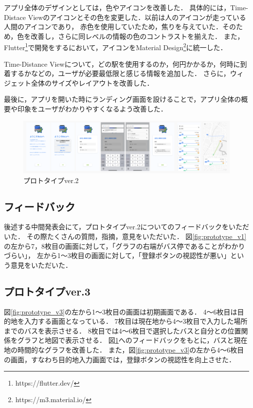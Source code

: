 アプリ全体のデザインとしては，色やアイコンを改善した．
具体的には，Time-Distace Viewのアイコンとその色を変更した．以前は人のアイコンが走っている人間のアイコンであり，
赤色を使用していたため，焦りを与えていた．そのため，色を改善し，さらに同レベルの情報の色のコントラストを揃えた．
また，Flutter\footnote{https://flutter.dev/}で開発をするにおいて，アイコンをMaterial Design\footnote{https://m3.material.io/}に統一した．

Time-Distance Viewについて，どの駅を使用するのか，何円かかるか，何時に到着するかなどの，ユーザが必要最低限と感じる情報を追加した．
さらに，ウィジェット全体のサイズやレイアウトを改善した．

最後に，アプリを開いた時にランディング画面を設けることで，アプリ全体の概要や印象をユーザがわかりやすくなるよう改善した．

\begin{figure}[H]
    \centering
    \includegraphics[width=14cm]{images/prototype_v3.png}
    \caption{プロトタイプver.2}
    \label{fig:prototype_v2}
\end{figure}

\subsection{フィードバック}
後述する中間発表会にて，プロトタイプver.2についてのフィードバックをいただいた．
その際たくさんの質問，指摘，意見をいただいた．
図\ref{fig:prototype_v1}の左から7，8枚目の画面に対して，「グラフの右端がバス停であることがわかりづらい」，
左から1〜3枚目の画面に対して，「登録ボタンの視認性が悪い」という意見をいただいた．

\subsection{プロトタイプver.3}
図\ref{fig:prototype_v3}の左から1〜3枚目の画面は初期画面である．
4〜6枚目は目的地を入力する画面となっている．
7枚目は現在地から4〜3枚目で入力した場所までのバスを表示させる．
8枚目では4〜6枚目で選択したバスと自分との位置関係をグラフと地図で表示させる．
図\ref{fig:prototype_v2}へのフィードバックをもとに，バスと現在地の時間的なグラフを改善した．
また，図\ref{fig:prototype_v3}の左から4〜6枚目の画面，すなわち目的地入力画面では，登録ボタンの視認性を向上させた．

